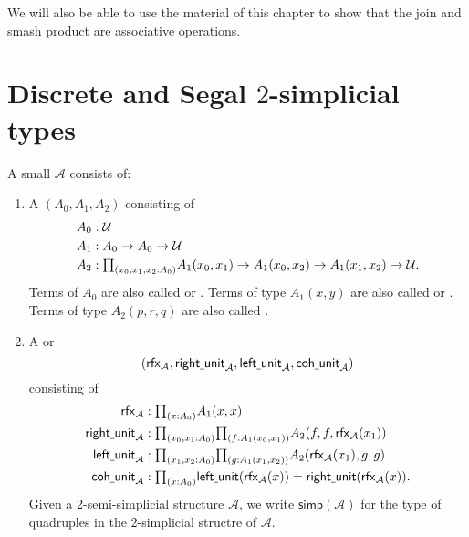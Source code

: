 We will also be able to use the material of this chapter to show that the join and smash product are associative operations. 

\section{Discrete and Segal $2$-simplicial types}

\begin{defn}
A small  $\mathcal{A}$ consists of:
\begin{enumerate}
\item A  $(A_0,A_1,A_2)$ consisting of
\begin{align*}
A_0 & : \UU \\
A_1 & : A_0 \to A_0 \to \UU \\
A_2 & : \prd{x_0,x_1,x_2:A_0} A_1(x_0,x_1)\to A_1(x_0,x_2)\to A_1(x_1,x_2)\to\UU.
\end{align*}
Terms of $A_0$ are also called  or . Terms of type $A_1(x,y)$ are also called  or . Terms of type $A_2(p,r,q)$ are also called .
\item A  or 
\begin{equation*}
(\rfx{\mathcal{A}},\mathsf{right\usc{}unit}_{\mathcal{A}},\mathsf{left\usc{}unit}_{\mathcal{A}},\mathsf{coh\usc{}unit}_{\mathcal{A}})
\end{equation*}
consisting of
\begin{align*}
\rfx{\mathcal{A}} & : \prd{x:\pts{A}} \edg{A}(x,x) \\
\mathsf{right\usc{}unit}_{\mathcal{A}} & : \prd{x_0,x_1:A_0}{f:A_1(x_0,x_1)} A_2(f,f,\rfx{\mathcal{A}}(x_1)) \\
\mathsf{left\usc{}unit}_{\mathcal{A}} & : \prd{x_1,x_2:A_0}{g:A_1(x_1,x_2)} A_2(\rfx{\mathcal{A}}(x_1),g,g) \\
\mathsf{coh\usc{}unit}_{\mathcal{A}} & : \prd{x:A_0} \mathsf{left\usc{}unit}(\rfx{\mathcal{A}}(x))=\mathsf{right\usc{}unit}(\rfx{\mathcal{A}}(x)).
\end{align*}
Given a 2-semi-simplicial structure $\mathcal{A}$, we write $\mathsf{simp}(\mathcal{A})$ for the type of quadruples in the $2$-simplicial structre of $\mathcal{A}$.
\end{enumerate}
\end{defn}

